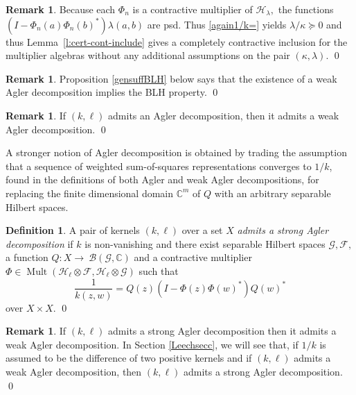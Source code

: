 \documentclass[a4paper,reqno,index]{amsart}
\numberwithin{equation}{section}
\newcommand{\CC}{\mathbb{C}}
\newcommand{\Mult}{\operatorname{Mult}}
\newcommand{\cH}{\mathcal{H}}
\newcommand{\HSF}{\mathcal{F}}
\newcommand{\genk}{\kappa} %
\newcommand{\genl}{\lambda} %
\theoremstyle{definition}
\newtheorem{definition}[theorem]{Definition}
\newtheorem{remark}[theorem]{Remark}
\begin{document}
\begin{remark}
Because each $\Phi_n$ is a contractive multiplier of $\cH_\genl,$ the functions   $(I-\Phi_n(a)\Phi_n(b)^*) \genl(a,b)$ are psd. 
Thus \eqref{again1/k=}  yields $\genl/\genk\succeq 0$ and thus Lemma~\ref{l:cert-cont-include} gives  a completely contractive inclusion for the multiplier algebras without any additional assumptions on the pair $(\genk, \genl).$  
\qed\end{remark}

\begin{remark}
    Proposition \ref{gensuffBLH} below says that the existence of a weak Agler decomposition implies the BLH property. 
    \qed
\end{remark}

\begin{remark}
If $(k, \ell)$ admits an Agler decomposition, then it admits a weak Agler decomposition.
\qed
\end{remark}

A stronger notion of Agler decomposition is obtained by
trading the assumption that a sequence of weighted sum-of-squares representations converges to $1/k$, found
in the definitions of both Agler and weak Agler decompositions,
for replacing the finite dimensional domain $\CC^m$ of $Q$ 
with an arbitrary separable Hilbert spaces. 

\begin{definition}\label{strongAgler}
A pair of kernels $(k, \ell)$  over a set $X$ \textit{admits a strong Agler decomposition} if $k$ is non-vanishing and
 there exist  separable Hilbert spaces $\mathcal{G}, \HSF,$ 
    a function $Q:X\to \
\mathcal{B}(\mathcal{G}, \mathbb{C})$ and a contractive multiplier $\Phi\in \Mult(\cH_\ell\otimes \HSF, \cH_\ell\otimes \mathcal{G})$ such that
\begin{equation} \label{strongAglerb}
     \frac{1}{k(z,w)} = Q(z) \left (I-\Phi(z)\Phi(w)^* \right ) Q(w)^*
\end{equation}
over $X\times X.$
\qed
\end{definition}


\begin{remark}
If $(k, \ell)$ admits a strong Agler decomposition then it admits a weak Agler decomposition. In  Section \ref{Leechsecc}, we will see that, if $1/k$ is assumed to be the difference of two positive kernels and if $(k, \ell)$ admits a weak Agler decomposition,  then $(k, \ell)$ admits a strong Agler decomposition.
\qed\end{remark}
\end{document}
